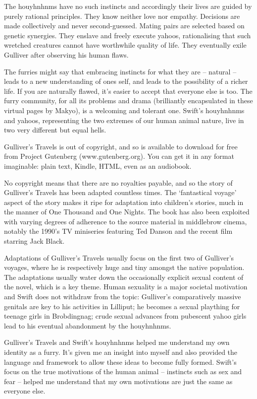 The houyhnhnms have no such instincts and accordingly their lives are guided by purely rational principles. They know neither love nor empathy. Decisions are made collectively and never second-guessed. Mating pairs are selected based on genetic synergies. They enslave and freely execute yahoos, rationalising that such wretched creatures cannot have worthwhile quality of life. They eventually exile Gulliver after observing his human flaws.

The furries might say that embracing instincts for what they are -- natural -- leads to a new understanding of ones self, and leads to the possibility of a richer life. If you are naturally flawed, it's easier to accept that everyone else is too. The furry community, for all its problems and drama (brilliantly encapsulated in these virtual pages by Makyo), is a welcoming and tolerant one. Swift's houyhnhnms and yahoos, representing the two extremes of our human animal nature, live in two very different but equal hells.

Gulliver's Travels is out of copyright, and so is available to download for free from Project Gutenberg (www.gutenberg.org). You can get it in any format imaginable: plain text, Kindle, HTML, even as an audiobook.

No copyright means that there are no royalties payable, and so the story of Gulliver's Travels has been adapted countless times. The `fantastical voyage' aspect of the story makes it ripe for adaptation into children's stories, much in the manner of One Thousand and One Nights. The book has also been exploited with varying degrees of adherence to the source material in middlebrow cinema, notably the 1990's TV miniseries featuring Ted Danson and the recent film starring Jack Black.

Adaptations of Gulliver's Travels usually focus on the first two of Gulliver's voyages, where he is respectively huge and tiny amongst the native population. The adaptations usually water down the occasionally explicit sexual content of the novel, which is a key theme. Human sexuality is a major societal motivation and Swift does not withdraw from the topic: Gulliver's comparatively massive genitals are key to his activities in Lilliput; he becomes a sexual plaything for teenage girls in Brobdingnag; crude sexual advances from pubescent yahoo girls lead to his eventual abandonment by the houyhnhnms.

Gulliver's Travels and Swift's houyhnhnms helped me understand my own identity as a furry. It's given me an insight into myself and also provided the language and framework to allow these ideas to become fully formed. Swift's focus on the true motivations of the human animal -- instincts such as sex and fear -- helped me understand that my own motivations are just the same as everyone else.

